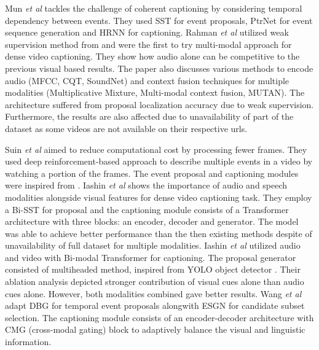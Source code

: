 \par Mun \textit{et al} \cite{mun2019streamlined} tackles the challenge of coherent captioning by considering temporal dependency between events. They used SST for event proposals, PtrNet for event sequence generation and HRNN for captioning. Rahman \textit{et al} \cite{rahman2019watch} utilized weak supervision method from \cite{duan2018weakly} and were the first to try multi-modal approach for dense video captioning. They show how audio alone can be competitive to the previous visual based results. The paper also discusses various methods to encode audio (MFCC, CQT, SoundNet) and context fusion techniques for multiple modalities (Multiplicative Mixture, Multi-modal context fusion, MUTAN). The architecture suffered from proposal localization accuracy due to weak supervision. Furthermore, the results are also affected due to unavailability of part of the dataset as some videos are not available on their respective urls.

\par \sloppy Suin \textit{et al} \cite{suin2020efficient} aimed to reduce computational cost by processing fewer frames. They used deep reinforcement-based approach to describe multiple events in a video by watching a portion of the frames. The event proposal and captioning modules were inspired from \cite{zhou2018end}. Iashin \textit{et al} \cite{iashin2020multimodal} shows the importance of audio and speech modalities alongside visual features for dense video captioning task. They employ a Bi-SST for proposal and the captioning module consists of a Transformer architecture with three blocks: an encoder, decoder and generator. The model was able to achieve better performance than the then existing methods despite of unavailability of full dataset for multiple modalities. Iashin \textit{et al} \cite{iashin2020better} utilized audio and video with Bi-modal Transformer for captioning. The proposal generator consisted of multiheaded method, inspired from YOLO object detector \cite{yolo}. Their ablation analysis depicted stronger contribution of visual cues alone than audio cues alone. However, both modalities combined gave better results. Wang \textit{et al} \cite{wang2020densecaptioning} adapt DBG \cite{lin2019fast} for temporal event proposals alongwith ESGN \cite{mun2019streamlined} for candidate subset selection. The captioning module consists of an encoder-decoder architecture with CMG (cross-modal gating) block to adaptively balance the visual and linguistic information.

